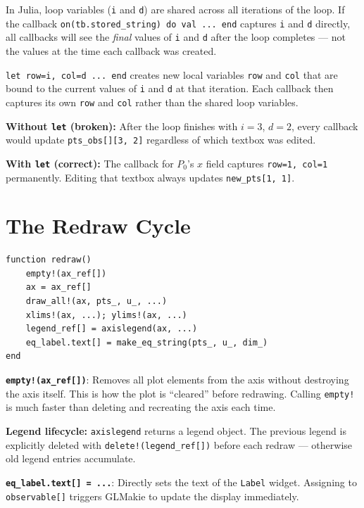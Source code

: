\documentclass[12pt, a4paper]{article}
\newcommand{\cd}[1]{\texttt{#1}}
\begin{document}
In Julia, loop variables (\cd{i} and \cd{d}) are shared
across all iterations of the loop.
If the callback \cd{on(tb.stored\_string) do val ... end}
captures \cd{i} and \cd{d} directly, all callbacks will
see the \emph{final} values of \cd{i} and \cd{d} after
the loop completes --- not the values at the time each
callback was created.

\cd{let row=i, col=d ... end} creates new local variables
\cd{row} and \cd{col} that are bound to the current
values of \cd{i} and \cd{d} at that iteration.
Each callback then captures its own \cd{row} and \cd{col}
rather than the shared loop variables.

\begin{examplebox}
\textbf{Without \cd{let} (broken):}
After the loop finishes with $i=3$, $d=2$,
every callback would update \cd{pts\_obs[][3, 2]}
regardless of which textbox was edited.

\textbf{With \cd{let} (correct):}
The callback for $P_0$'s $x$ field captures \cd{row=1, col=1}
permanently. Editing that textbox always updates
\cd{new\_pts[1, 1]}.
\end{examplebox}


\section{The Redraw Cycle}

\begin{verbatim}
function redraw()
    empty!(ax_ref[])
    ax = ax_ref[]
    draw_all!(ax, pts_, u_, ...)
    xlims!(ax, ...); ylims!(ax, ...)
    legend_ref[] = axislegend(ax, ...)
    eq_label.text[] = make_eq_string(pts_, u_, dim_)
end
\end{verbatim}

\textbf{\cd{empty!(ax\_ref[])}}:
Removes all plot elements from the axis without
destroying the axis itself.
This is how the plot is ``cleared'' before redrawing.
Calling \cd{empty!} is much faster than deleting and
recreating the axis each time.

\textbf{Legend lifecycle:}
\cd{axislegend} returns a legend object.
The previous legend is explicitly deleted with
\cd{delete!(legend\_ref[])} before each redraw ---
otherwise old legend entries accumulate.

\textbf{\cd{eq\_label.text[] = ...}}:
Directly sets the text of the \cd{Label} widget.
Assigning to \cd{observable[]} triggers GLMakie to
update the display immediately.
\end{document}
